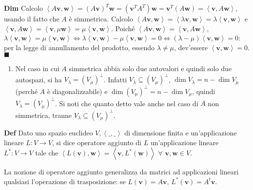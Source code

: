 \documentclass{article}
\begin{document}
\textbf{Dim} Calcolo $\left\langle A\mathbf{v,w}\right\rangle =\left( A%
\mathbf{v}\right) ^{T}\mathbf{w}=\left( \mathbf{v}^{T}A^{T}\right) \mathbf{w}%
=\mathbf{v}^{T}\left( A\mathbf{w}\right) =\left\langle \mathbf{v},A\mathbf{w}%
\right\rangle $, usando il fatto che $A$ \`{e} simmetrica. Calcolo $%
\left\langle A\mathbf{v,w}\right\rangle =\left\langle \lambda \mathbf{v,w}%
\right\rangle =\lambda \left\langle \mathbf{v,w}\right\rangle $ e $%
\left\langle \mathbf{v,}A\mathbf{w}\right\rangle =\left\langle \mathbf{v,}%
\mu \mathbf{w}\right\rangle =\mu \left\langle \mathbf{v,w}\right\rangle $.
Poich\'{e} $\left\langle A\mathbf{v,w}\right\rangle =\left\langle \mathbf{v}%
,A\mathbf{w}\right\rangle $, $\lambda \left\langle \mathbf{v,w}\right\rangle
=\mu \left\langle \mathbf{v,w}\right\rangle \Longleftrightarrow \lambda
\left\langle \mathbf{v,w}\right\rangle -\mu \left\langle \mathbf{v,w}%
\right\rangle =0\Longleftrightarrow \left( \lambda -\mu \right) \left\langle 
\mathbf{v,w}\right\rangle =0$: per la legge di annullamento del prodotto,
essendo $\lambda \neq \mu $, dev'essere $\left\langle \mathbf{v,w}%
\right\rangle =0$. $\blacksquare $

\begin{enumerate}
\item Nel caso in cui $A$ simmetrica abbia solo due autovalori e quindi solo
due autospazi, si ha $V_{\lambda }=\left( V_{\mu }\right) ^{\perp }$.
Infatti $V_{\lambda }\subseteq \left( V_{\mu }\right) ^{\perp }$, $\dim
V_{\lambda }=n-\dim V_{\mu }$ (perch\'{e} $A$ \`{e} diagonalizzabile) e $%
\dim \left( V_{\mu }\right) ^{\perp }=n-\dim V_{\mu }$, quindi $V_{\lambda
}=\left( V_{\mu }\right) ^{\perp }$. Si noti che quanto detto vale anche nel
caso di $A$ non simmetrica, tranne $V_{\lambda }\subseteq \left( V_{\mu
}\right) ^{\perp }$.
\end{enumerate}

\textbf{Def} Dato uno spazio euclideo $V,\left\langle \_,\_\right\rangle $
di dimensione finita e un'applicazione lineare $L:V\rightarrow V$, si dice
operatore aggiunto di $L$ un'applicazione lineare $L^{\ast }:V\rightarrow V$
tale che $\left\langle L\left( \mathbf{v}\right) \mathbf{,w}\right\rangle
=\left\langle \mathbf{v},L^{\ast }\left( \mathbf{w}\right) \right\rangle $ $%
\forall $ $\mathbf{v,w}\in V$.

La nozione di operatore aggiunto generalizza da matrici ad applicazioni
lineari qualsiasi l'operazione di trasposizione: se $L\left( \mathbf{v}%
\right) =A\mathbf{v}$, $L^{\ast }\left( \mathbf{v}\right) =A^{t}\mathbf{v}$.
\end{document}
